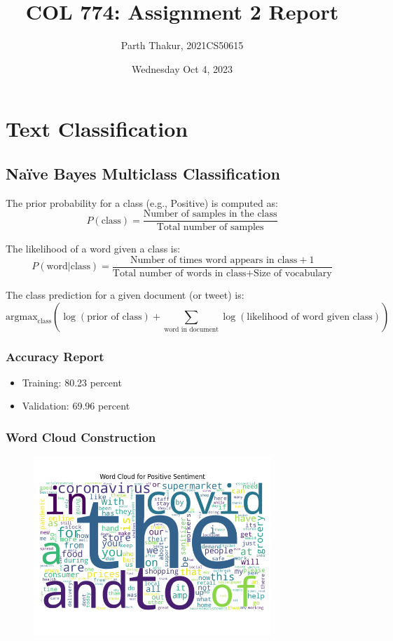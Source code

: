\documentclass[12pt,a4paper]{article}
\title{COL 774: Assignment 2 Report}
\author{Parth Thakur, 2021CS50615}
\date{Wednesday Oct 4, 2023}
\begin{document}
\maketitle

\section{Text Classification}
\subsection{Naïve Bayes Multiclass Classification}

The prior probability for a class (e.g., Positive) is computed as:
\begin{equation}
P(\text{class}) = \frac{\text{Number of samples in the class}}{\text{Total number of samples}}
\end{equation}

The likelihood of a word given a class is:
\begin{equation}
P(\text{word} | \text{class}) = \frac{\text{Number of times word appears in class} + 1}{\text{Total number of words in class} + \text{Size of vocabulary}}
\end{equation}

The class prediction for a given document (or tweet) is:
\begin{equation}
\text{argmax}_{\text{class}} \left( \log(\text{prior of class}) + \sum_{\text{word in document}} \log(\text{likelihood of word given class}) \right)
\end{equation}

\subsubsection{Accuracy Report}
\begin{itemize}
    \item Training: 80.23 percent  
    \item Validation: 69.96 percent
\end{itemize}


\subsubsection{Word Cloud Construction}
\begin{figure}[H]
\centering
\includegraphics[width=0.8\textwidth]{Assignment 2/q1/wordcloud_Positive.png}
\end{figure}
\end{document}
